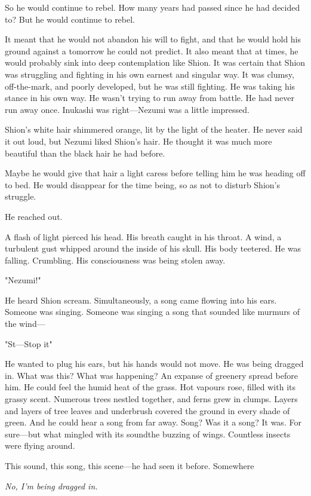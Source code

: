 So he would continue to rebel. How many years had passed since he had
decided to? But he would continue to rebel.

It meant that he would not abandon his will to fight, and that he would
hold his ground against a tomorrow he could not predict. It also meant
that at times, he would probably sink into deep contemplation like
Shion. It was certain that Shion was struggling and fighting in his own
earnest and singular way. It was clumsy, off-the-mark, and poorly
developed, but he was still fighting. He was taking his stance in his
own way. He wasn't trying to run away from battle. He had never run away
once. Inukashi was right---Nezumi was a little impressed.

Shion's white hair shimmered orange, lit by the light of the heater. He
never said it out loud, but Nezumi liked Shion's hair. He thought it was
much more beautiful than the black hair he had before.

Maybe he would give that hair a light caress before telling him he was
heading off to bed. He would disappear for the time being, so as not to
disturb Shion's struggle.

He reached out.

A flash of light pierced his head. His breath caught in his throat. A
wind, a turbulent gust whipped around the inside of his skull. His body
teetered. He was falling. Crumbling. His consciousness was being stolen
away.

"Nezumi!"

He heard Shion scream. Simultaneously, a song came flowing into his
ears. Someone was singing. Someone was singing a song that sounded like
murmurs of the wind---

"St---Stop it\el "

He wanted to plug his ears, but his hands would not move. He was being
dragged in. What was this? What was happening? An expanse of greenery
spread before him. He could feel the humid heat of the grass. Hot
vapours rose, filled with its grassy scent. Numerous trees nestled
together, and ferns grew in clumps. Layers and layers of tree leaves and
underbrush covered the ground in every shade of green. And he could hear
a song from far away. Song? Was it a song? It was. For sure---but what
mingled with its sound\el the buzzing of wings. Countless insects were
flying around.

This sound, this song, this scene---he had seen it before. Somewhere\el 

\emph{No, I'm being dragged in.}

